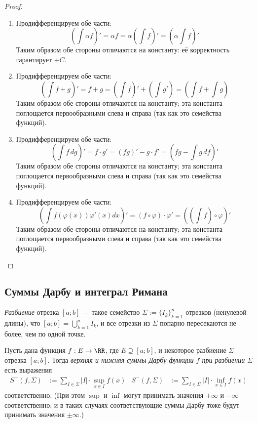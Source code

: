 \documentclass[12pt,a4paper]{article}
\begin{document}
    \begin{proof}
        \begin{enumerate}
            \item Продифференцируем обе части:
                \[\left(\int \alpha f\right)' = \alpha f = \alpha \left(\int f\right)' = \left(\alpha \int f\right)'\]
                Таким образом обе стороны отличаются на константу: её корректность гарантирует $+ C$.
            
            \item Продифференцируем обе части:
                \[\left(\int f + g\right)' = f + g = \left(\int f\right)' + \left(\int g'\right) = \left(\int f + \int g\right)\]
                Таким образом обе стороны отличаются на константу; эта константа поглощается первообразными слева и справа (так как это семейства функций).
            
            \item Продифференцируем обе части:
                \[\left(\int f\, dg\right)' = f\cdot g' = (fg)' - g\cdot f' = \left(fg - \int g\, df\right)'\]
                Таким образом обе стороны отличаются на константу; эта константа поглощается первообразными слева и справа (так как это семейства функций).
            
            \item Продифференцируем обе части:
                \[\left(\int f(\varphi(x))\varphi'(x)dx\right)' = (f \circ \varphi) \cdot \varphi' = \left(\left(\int f\right) \circ \varphi\right)'\]
                Таким образом обе стороны отличаются на константу; эта константа поглощается первообразными слева и справа (так как это семейства функций).
        \end{enumerate}
    \end{proof}

    \subsection{Суммы Дарбу и интеграл Римана}

    \begin{definition}
        \emph{Разбиение} отрезка $[a; b]$ --- такое семейство $\Sigma := \{I_k\}_{k=1}^n$ отрезков (ненулевой длины), что $[a; b] = \bigcup_{k=1}^n I_k$, и все отрезки из $\Sigma$ попарно пересекаются не более, чем по одной точке.

        Пусть дана функция $f: E \to \RR$, где $E \supseteq [a; b]$, и некоторое разбиение $\Sigma$ отрезка $[a; b]$. Тогда \emph{верхняя и нижняя суммы Дарбу функции $f$ при разбиении $\Sigma$} есть выражения
        \begin{align*}
            S^+(f, \Sigma) &:= \sum_{I \in \Sigma} |I| \cdot \sup_{x \in I} f(x)&
            S^-(f, \Sigma) &:= \sum_{I \in \Sigma} |I| \cdot \inf_{x \in I} f(x)
        \end{align*}
        соответственно. (При этом $\sup$ и $\inf$ могут принимать значения $+\infty$ и $-\infty$ соответственно; и в таких случаях соответствующие суммы Дарбу тоже будут принимать значения $\pm \infty$.)
    \end{definition}
\end{document}

